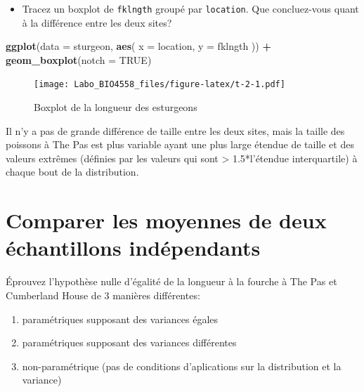 \documentclass[
  12pt,
]{book}
\newenvironment{Shaded}{\begin{snugshade}}{\end{snugshade}}
\newcommand{\DataTypeTok}[1]{\textcolor[rgb]{0.13,0.29,0.53}{#1}}
\newcommand{\KeywordTok}[1]{\textcolor[rgb]{0.13,0.29,0.53}{\textbf{#1}}}
\newcommand{\NormalTok}[1]{#1}
\newcommand{\OperatorTok}[1]{\textcolor[rgb]{0.81,0.36,0.00}{\textbf{#1}}}
\newcommand{\OtherTok}[1]{\textcolor[rgb]{0.56,0.35,0.01}{#1}}
\newcommand{\StringTok}[1]{\textcolor[rgb]{0.31,0.60,0.02}{#1}}
\providecommand{\tightlist}{%
  \setlength{\itemsep}{0pt}\setlength{\parskip}{0pt}}
\begin{document}
\begin{itemize}
\tightlist
\item
  Tracez un boxplot de \texttt{fklngth} groupé par \texttt{location}. Que concluez-vous quant à la différence entre les deux sites?
\end{itemize}

\begin{Shaded}
\begin{Highlighting}[]
\KeywordTok{ggplot}\NormalTok{(}\DataTypeTok{data =}\NormalTok{ sturgeon, }\KeywordTok{aes}\NormalTok{(}
  \DataTypeTok{x =}\NormalTok{ location,}
  \DataTypeTok{y =}\NormalTok{ fklngth}
\NormalTok{)) }\OperatorTok{+}
\StringTok{  }\KeywordTok{geom\_boxplot}\NormalTok{(}\DataTypeTok{notch =} \OtherTok{TRUE}\NormalTok{)}
\end{Highlighting}
\end{Shaded}

\begin{figure}
\centering
\texttt{[image: Labo\_BIO4558\_files/figure-latex/t-2-1.pdf]}
\caption{\label{fig:t-2}Boxplot de la longueur des esturgeons}
\end{figure}

Il n'y a pas de grande différence de taille entre les deux sites, mais la taille des poissons à The Pas est plus variable ayant une plus large étendue de taille et des valeurs extrêmes (définies par les valeurs qui sont \textgreater{} 1.5*l'étendue interquartile) à chaque bout de la distribution.

\hypertarget{comparer-les-moyennes-de-deux-uxe9chantillons-induxe9pendants}{%
\section{Comparer les moyennes de deux échantillons indépendants}\label{comparer-les-moyennes-de-deux-uxe9chantillons-induxe9pendants}}

Éprouvez l'hypothèse nulle d'égalité de la longueur à la fourche à The Pas et Cumberland House de 3 manières différentes:

\begin{enumerate}
\def\labelenumi{\arabic{enumi}.}
\tightlist
\item
  paramétriques supposant des variances égales
\item
  paramétriques supposant des variances différentes
\item
  non-paramétrique (pas de conditions d'aplications sur la distribution et la variance)
\end{enumerate}
\end{document}

